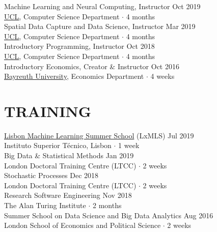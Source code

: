 \documentclass{cv}
\begin{document}
Machine Learning and Neural Computing, Instructor \hfill Oct 2019 \\
{\color{lightgray} \href{https://www.ucl.ac.uk/}{UCL}, Computer Science Department $\cdot$ 4 months} \\

Spatial Data Capture and Data Science, Instructor \hfill Mar 2019 \\
{\color{lightgray} \href{https://www.ucl.ac.uk/}{UCL}, Computer Science Department $\cdot$ 4 months} \\

Introductory Programming, Instructor \hfill Oct 2018 \\
{\color{lightgray} \href{https://www.ucl.ac.uk/}{UCL}, Computer Science Department $\cdot$ 4 months}  \\

Introductory Economics, Creator \& Instructor \hfill Oct 2016 \\
{\color{lightgray} \href{https://www.uni-bayreuth.de/en/}{Bayreuth University}, Economics Department $\cdot$ 4 weeks} \\

\section{TRAINING}

\href{http://lxmls.it.pt/}{Lisbon Machine Learning Summer School} (LxMLS) \hfill Jul 2019 \\
{\color{lightgray} Instituto Superior Técnico, Lisbon $\cdot$ 1 week} \\

Big Data \& Statistical Methods \hfill Jan 2019  \\
{\color{lightgray} London Doctoral Training Centre (LTCC) $\cdot$ 2 weeks} \\

Stochastic Processes \hfill Dec 2018  \\
{\color{lightgray} London Doctoral Training Centre (LTCC) $\cdot$ 2 weeks} \\

Research Software Engineering \hfill Nov 2018 \\
{\color{lightgray} The Alan Turing Institute $\cdot$ 2 months} \\

Summer School on Data Science and Big Data Analytics \hfill Aug 2016 \\
{\color{lightgray} London School of Economics and Political Science $\cdot$ 2 weeks} \\
\end{document}
